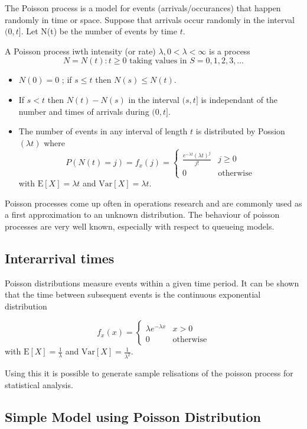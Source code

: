 The Poisson process is a model for events (arrivals/occurances) that
happen randomly in time or space.  Suppose that arrivals occur
randomly in the interval $(0,t]$.  Let N(t) be the number of events by
time $t$.

A Poisson process iwth intensity (or rate) $\lambda, 0 < \lambda <
\infty$ is a process
\[
  N = {N(t) : t \geq 0} \mbox{ taking values in } S = {0,1,2,3, \ldots}
\]
\begin{itemize}
\item $N(0) = 0$ ; if $s \leq t$ then $N(s) \leq N(t)$.
\item If $s < t$ then $N(t) - N(s)$ in the interval $(s,t]$ is
independant of the number and times of arrivals during $(0,t]$.
\item The number of events in any interval of length $t$ is
distributed by Possion$(\lambda t)$ where
\[
  P(N(t) = j) = f_x(j) =
    \left\{
      \begin{array}{ll}
 	\frac{e^{-\lambda t}(\lambda t)^j}{j!} & j \geq 0 \\
	0 & \mbox{otherwise}
      \end{array}
    \right.
\]
with $\mbox{E}[X] = \lambda t$ and $\mbox{Var}[X] = \lambda t$.
\end{itemize}

Poisson processes come up often in operations research and are
commonly used as a first approximation to an unknown distribution.
The behaviour of poisson processes are very well known, especially
with respect to queueing models.

\subsection{Interarrival times}

Poisson distributions measure events within a given time period.  It
can be shown that the time between subsequent events is the continuous
exponential distribution

\[
  f_x(x) =
    \left\{
      \begin{array}{ll}
 	\lambda e^{-\lambda x} & x > 0 \\
	0 & \mbox{otherwise}
      \end{array}
    \right.
\]
with $\mbox{E}[X] = \frac{1}{\lambda}$ and $\mbox{Var}[X] =
\frac{1}{\lambda^2}$.

Using this it is possible to generate sample relisations of the
poisson process for statistical analysis.

\subsection{Simple Model using Poisson Distribution}


